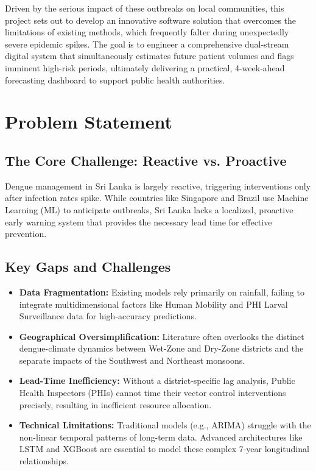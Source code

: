 ﻿\documentclass[12pt,a4paper]{article}
\begin{document}
Driven by the serious impact of these outbreaks on local communities, this project sets out to develop an innovative software solution that overcomes the limitations of existing methods, which frequently falter during unexpectedly severe epidemic spikes. The goal is to engineer a comprehensive dual-stream digital system that simultaneously estimates future patient volumes and flags imminent high-risk periods, ultimately delivering a practical, 4-week-ahead forecasting dashboard to support public health authorities.



\section{Problem Statement}

\subsection{The Core Challenge: Reactive vs. Proactive}
Dengue management in Sri Lanka is largely reactive, triggering interventions only after infection rates spike. While countries like Singapore and Brazil use Machine Learning (ML) to anticipate outbreaks, Sri Lanka lacks a localized, proactive early warning system that provides the necessary lead time for effective prevention.

\subsection{Key Gaps and Challenges}
\begin{itemize}
    \item \textbf{Data Fragmentation:} Existing models rely primarily on rainfall, failing to integrate multidimensional factors like Human Mobility and PHI Larval Surveillance data for high-accuracy predictions.
    \item \textbf{Geographical Oversimplification:} Literature often overlooks the distinct dengue-climate dynamics between Wet-Zone and Dry-Zone districts and the separate impacts of the Southwest and Northeast monsoons.
    \item \textbf{Lead-Time Inefficiency:} Without a district-specific lag analysis, Public Health Inspectors (PHIs) cannot time their vector control interventions precisely, resulting in inefficient resource allocation.
    \item \textbf{Technical Limitations:} Traditional models (e.g., ARIMA) struggle with the non-linear temporal patterns of long-term data. Advanced architectures like LSTM and XGBoost are essential to model these complex 7-year longitudinal relationships.
\end{itemize}
\end{document}
